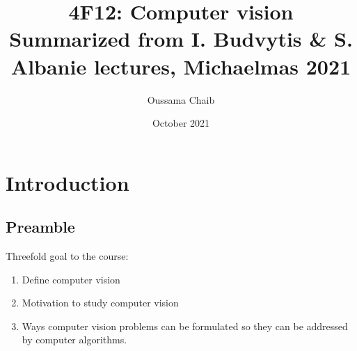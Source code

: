 \documentclass[a4paper,11pt]{article}
\title{%
	4F12: Computer vision \\
	\vspace{10pt}
	\small Summarized from I. Budvytis \& S. Albanie lectures, Michaelmas 2021}
\author{\small Oussama Chaib}
\date{\small October 2021}
\begin{document}
	\maketitle
		\tableofcontents
		\pagebreak
\section{Introduction}
\subsection{Preamble}
Threefold goal to the course:
\begin{enumerate}
	\item Define computer vision
	\item Motivation to study computer vision
	\item Ways computer vision problems can be formulated so they can be addressed by computer algorithms.
\end{enumerate}
\end{document}

